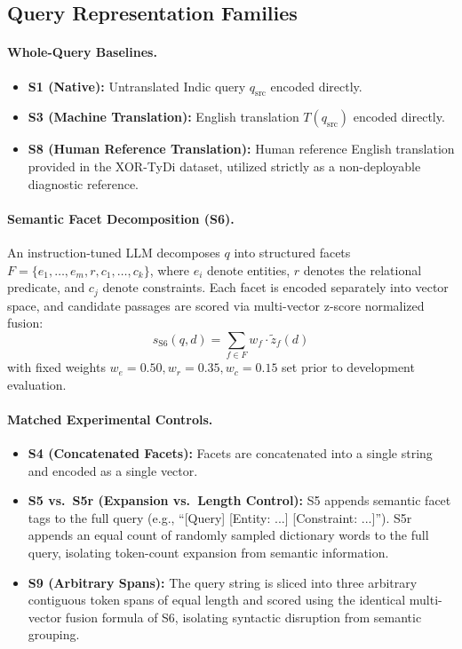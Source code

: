 \documentclass[11pt]{article}
\begin{document}
\subsection{Query Representation Families}
\label{sec:rep_families}

\paragraph{Whole-Query Baselines.}
\begin{itemize}
    \item \textbf{S1 (Native):} Untranslated Indic query $q_{\mathrm{src}}$ encoded directly.
    \item \textbf{S3 (Machine Translation):} English translation $T(q_{\mathrm{src}})$ encoded directly.
    \item \textbf{S8 (Human Reference Translation):} Human reference English translation provided in the XOR-TyDi dataset, utilized strictly as a non-deployable diagnostic reference.
\end{itemize}

\paragraph{Semantic Facet Decomposition (S6).} An instruction-tuned LLM decomposes $q$ into structured facets $F = \{e_1, \dots, e_m, r, c_1, \dots, c_k\}$, where $e_i$ denote entities, $r$ denotes the relational predicate, and $c_j$ denote constraints. Each facet is encoded separately into vector space, and candidate passages are scored via multi-vector z-score normalized fusion:
\begin{equation}
s_{\mathrm{S6}}(q, d) = \sum_{f \in F} w_f \cdot \tilde{z}_f(d)
\end{equation}
with fixed weights $w_e = 0.50, w_r = 0.35, w_c = 0.15$ set prior to development evaluation.

\paragraph{Matched Experimental Controls.}
\begin{itemize}
    \item \textbf{S4 (Concatenated Facets):} Facets are concatenated into a single string and encoded as a single vector.
    \item \textbf{S5 vs.\ S5r (Expansion vs.\ Length Control):} S5 appends semantic facet tags to the full query (e.g., ``[Query] [Entity: ...] [Constraint: ...]''). S5r appends an equal count of randomly sampled dictionary words to the full query, isolating token-count expansion from semantic information.
    \item \textbf{S9 (Arbitrary Spans):} The query string is sliced into three arbitrary contiguous token spans of equal length and scored using the identical multi-vector fusion formula of S6, isolating syntactic disruption from semantic grouping.
\end{itemize}
\end{document}

